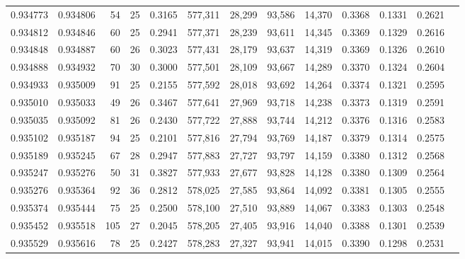 \begin{tabular}{rrrrrrrrrrrrr}
0.934773 & 0.934806 &    54 &  25 &                                     0.3165 & 577,311 &  28,299 &  93,586 &  14,370 & 0.3368 & 0.1331 & 0.2621 \\
0.934812 & 0.934846 &    60 &  25 &                                     0.2941 & 577,371 &  28,239 &  93,611 &  14,345 & 0.3369 & 0.1329 & 0.2616 \\
0.934848 & 0.934887 &    60 &  26 &                                     0.3023 & 577,431 &  28,179 &  93,637 &  14,319 & 0.3369 & 0.1326 & 0.2610 \\
0.934888 & 0.934932 &    70 &  30 &                                     0.3000 & 577,501 &  28,109 &  93,667 &  14,289 & 0.3370 & 0.1324 & 0.2604 \\
0.934933 & 0.935009 &    91 &  25 &                                     0.2155 & 577,592 &  28,018 &  93,692 &  14,264 & 0.3374 & 0.1321 & 0.2595 \\
0.935010 & 0.935033 &    49 &  26 &                                     0.3467 & 577,641 &  27,969 &  93,718 &  14,238 & 0.3373 & 0.1319 & 0.2591 \\
0.935035 & 0.935092 &    81 &  26 &                                     0.2430 & 577,722 &  27,888 &  93,744 &  14,212 & 0.3376 & 0.1316 & 0.2583 \\
0.935102 & 0.935187 &    94 &  25 &                                     0.2101 & 577,816 &  27,794 &  93,769 &  14,187 & 0.3379 & 0.1314 & 0.2575 \\
0.935189 & 0.935245 &    67 &  28 &                                     0.2947 & 577,883 &  27,727 &  93,797 &  14,159 & 0.3380 & 0.1312 & 0.2568 \\
0.935247 & 0.935276 &    50 &  31 &                                     0.3827 & 577,933 &  27,677 &  93,828 &  14,128 & 0.3380 & 0.1309 & 0.2564 \\
0.935276 & 0.935364 &    92 &  36 &                                     0.2812 & 578,025 &  27,585 &  93,864 &  14,092 & 0.3381 & 0.1305 & 0.2555 \\
0.935374 & 0.935444 &    75 &  25 &                                     0.2500 & 578,100 &  27,510 &  93,889 &  14,067 & 0.3383 & 0.1303 & 0.2548 \\
0.935452 & 0.935518 &   105 &  27 &                                     0.2045 & 578,205 &  27,405 &  93,916 &  14,040 & 0.3388 & 0.1301 & 0.2539 \\
0.935529 & 0.935616 &    78 &  25 &                                     0.2427 & 578,283 &  27,327 &  93,941 &  14,015 & 0.3390 & 0.1298 & 0.2531 \\

\end{tabular}
